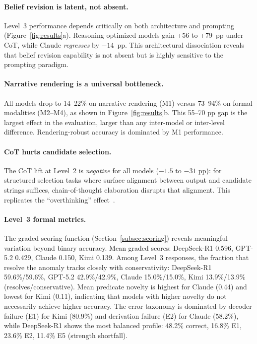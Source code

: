 \documentclass{article}
\theoremstyle{definition}
\begin{document}
\paragraph{Belief revision is latent, not absent.}
Level~3 performance depends critically on both architecture and prompting (Figure~\ref{fig:results}a). Reasoning-optimized models gain +56 to +79~pp under CoT, while Claude \emph{regresses} by $-14$~pp. This architectural dissociation reveals that belief revision capability is not absent but is highly sensitive to the prompting paradigm.

\paragraph{Narrative rendering is a universal bottleneck.}
All models drop to 14--22\% on narrative rendering (M1) versus 73--94\% on formal modalities (M2--M4), as shown in Figure~\ref{fig:results}b. This 55--70 pp gap is the largest effect in the evaluation, larger than any inter-model or inter-level difference. Rendering-robust accuracy is dominated by M1 performance.

\paragraph{CoT hurts candidate selection.}
The CoT lift at Level~2 is \emph{negative} for all models ($-1.5$ to $-31$ pp): for structured selection tasks where surface alignment between output and candidate strings suffices, chain-of-thought elaboration disrupts that alignment. This replicates the ``overthinking'' effect~\cite{chen2024overthinking}.

\paragraph{Level~3 formal metrics.}
The graded scoring function (Section~\ref{subsec:scoring}) reveals meaningful variation beyond binary accuracy. Mean graded scores: DeepSeek-R1 0.596, GPT-5.2 0.429, Claude 0.150, Kimi 0.139. Among Level~3 responses, the fraction that resolve the anomaly tracks closely with conservativity: DeepSeek-R1 59.6\%/59.6\%, GPT-5.2 42.9\%/42.9\%, Claude 15.0\%/15.0\%, Kimi 13.9\%/13.9\% (resolves/conservative). Mean predicate novelty is highest for Claude (0.44) and lowest for Kimi (0.11), indicating that models with higher novelty do not necessarily achieve higher accuracy. The error taxonomy is dominated by decoder failure (E1) for Kimi (80.9\%) and derivation failure (E2) for Claude (58.2\%), while DeepSeek-R1 shows the most balanced profile: 48.2\% correct, 16.8\% E1, 23.6\% E2, 11.4\% E5 (strength shortfall).
\end{document}
